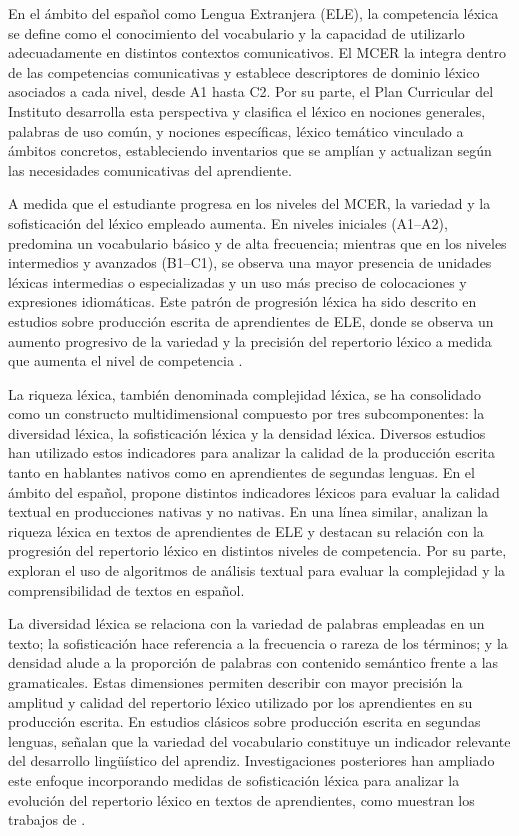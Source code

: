 \documentclass[spanish]{textolivre}
\begin{document}
En el ámbito del español como Lengua Extranjera (ELE), la competencia léxica se define como el conocimiento del vocabulario y la capacidad de utilizarlo adecuadamente en distintos contextos comunicativos. El MCER la integra dentro de las competencias comunicativas y establece descriptores de dominio léxico asociados a cada nivel, desde A1 hasta C2. Por su parte, el Plan Curricular del Instituto \textcite{instituto_cervantes2006} desarrolla esta perspectiva y clasifica el léxico en nociones generales, palabras de uso común, y nociones específicas, léxico temático vinculado a ámbitos concretos, estableciendo inventarios que se amplían y actualizan según las necesidades comunicativas del aprendiente.

A medida que el estudiante progresa en los niveles del MCER, la variedad y la sofisticación del léxico empleado aumenta. En niveles iniciales (A1–A2), predomina un vocabulario básico y de alta frecuencia; mientras que en los niveles intermedios y avanzados (B1–C1), se observa una mayor presencia de unidades léxicas intermedias o especializadas y un uso más preciso de colocaciones y expresiones idiomáticas. Este patrón de progresión léxica ha sido descrito en estudios sobre producción escrita de aprendientes de ELE, donde se observa un aumento progresivo de la variedad y la precisión del repertorio léxico a medida que aumenta el nivel de competencia \cite{vine_jara2021}.

La riqueza léxica, también denominada complejidad léxica, se ha consolidado como un constructo multidimensional compuesto por tres subcomponentes: la diversidad léxica, la sofisticación léxica y la densidad léxica. Diversos estudios han utilizado estos indicadores para analizar la calidad de la producción escrita tanto en hablantes nativos como en aprendientes de segundas lenguas. En el ámbito del español, \textcite{cuberos_vicente2019} propone distintos indicadores léxicos para evaluar la calidad textual en producciones nativas y no nativas. En una línea similar, \textcite{vine_jara2021} analizan la riqueza léxica en textos de aprendientes de ELE y destacan su relación con la progresión del repertorio léxico en distintos niveles de competencia. Por su parte, \textcite{jimenez_perez2024} exploran el uso de algoritmos de análisis textual para evaluar la complejidad y la comprensibilidad de textos en español.

La diversidad léxica se relaciona con la variedad de palabras empleadas en un texto; la sofisticación hace referencia a la frecuencia o rareza de los términos; y la densidad alude a la proporción de palabras con contenido semántico frente a las gramaticales. Estas dimensiones permiten describir con mayor precisión la amplitud y calidad del repertorio léxico utilizado por los aprendientes en su producción escrita. En estudios clásicos sobre producción escrita en segundas lenguas, \textcite{laufer_nation1995} señalan que la variedad del vocabulario constituye un indicador relevante del desarrollo lingüístico del aprendiz. Investigaciones posteriores han ampliado este enfoque incorporando medidas de sofisticación léxica para analizar la evolución del repertorio léxico en textos de aprendientes, como muestran los trabajos de \textcite{kyle_crossley2016}.
\end{document}
